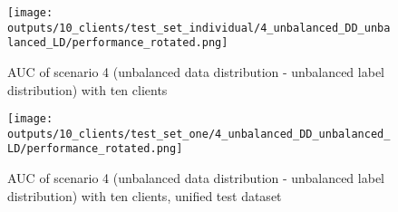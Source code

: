 

\begin{figure}[htb!]
    \centering
    \texttt{[image: outputs/10\_clients/test\_set\_individual/4\_unbalanced\_DD\_unbalanced\_LD/performance\_rotated.png]}
    \caption{AUC of scenario 4 (unbalanced data distribution - unbalanced label distribution) with ten clients}
    \label{fig:auc_box_10_clients_scenario_4}
\end{figure}



\begin{figure}[htb!]
    \centering
    \texttt{[image: outputs/10\_clients/test\_set\_one/4\_unbalanced\_DD\_unbalanced\_LD/performance\_rotated.png]}
    \caption{AUC of scenario 4 (unbalanced data distribution - unbalanced label distribution) with ten clients, unified test dataset}
    \label{fig:auc_box_10_clients_scenario_4_uni}
\end{figure}


